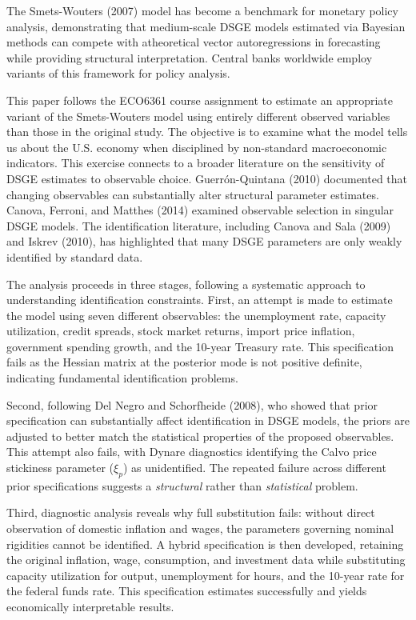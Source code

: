 \documentclass[12pt]{article}
\begin{document}
The Smets-Wouters (2007) model has become a benchmark for monetary policy analysis, demonstrating that medium-scale DSGE models estimated via Bayesian methods can compete with atheoretical vector autoregressions in forecasting while providing structural interpretation. Central banks worldwide employ variants of this framework for policy analysis.

This paper follows the ECO6361 course assignment to estimate an appropriate variant of the Smets-Wouters model using entirely different observed variables than those in the original study. The objective is to examine what the model tells us about the U.S. economy when disciplined by non-standard macroeconomic indicators. This exercise connects to a broader literature on the sensitivity of DSGE estimates to observable choice. Guerr\'{o}n-Quintana (2010) documented that changing observables can substantially alter structural parameter estimates. Canova, Ferroni, and Matthes (2014) examined observable selection in singular DSGE models. The identification literature, including Canova and Sala (2009) and Iskrev (2010), has highlighted that many DSGE parameters are only weakly identified by standard data.

The analysis proceeds in three stages, following a systematic approach to understanding identification constraints. First, an attempt is made to estimate the model using seven different observables: the unemployment rate, capacity utilization, credit spreads, stock market returns, import price inflation, government spending growth, and the 10-year Treasury rate. This specification fails as the Hessian matrix at the posterior mode is not positive definite, indicating fundamental identification problems.

Second, following Del Negro and Schorfheide (2008), who showed that prior specification can substantially affect identification in DSGE models, the priors are adjusted to better match the statistical properties of the proposed observables. This attempt also fails, with Dynare diagnostics identifying the Calvo price stickiness parameter ($\xi_p$) as unidentified. The repeated failure across different prior specifications suggests a \textit{structural} rather than \textit{statistical} problem.

Third, diagnostic analysis reveals why full substitution fails: without direct observation of domestic inflation and wages, the parameters governing nominal rigidities cannot be identified. A hybrid specification is then developed, retaining the original inflation, wage, consumption, and investment data while substituting capacity utilization for output, unemployment for hours, and the 10-year rate for the federal funds rate. This specification estimates successfully and yields economically interpretable results.
\end{document}
